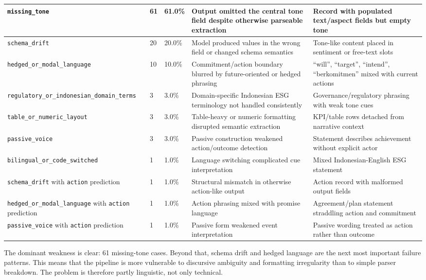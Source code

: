 \begin{landscape}
\begin{table}[p]
\begin{tabularx}{\linewidth}{|X|p{1.8cm}|p{1.8cm}|X|X|}
\texttt{missing\_tone} & 61 & 61.0\% & Output omitted the central tone field despite otherwise parseable extraction & Record with populated text/aspect fields but empty tone \\ \hline
\texttt{schema\_drift} & 20 & 20.0\% & Model produced values in the wrong field or changed schema semantics & Tone-like content placed in sentiment or free-text slots \\ \hline
\texttt{hedged\_or\_modal\_language} & 10 & 10.0\% & Commitment/action boundary blurred by future-oriented or hedged phrasing & “will”, “target”, “intend”, “berkomitmen” mixed with current actions \\ \hline
\texttt{regulatory\_or\_indonesian\_domain\_terms} & 3 & 3.0\% & Domain-specific Indonesian ESG terminology not handled consistently & Governance/regulatory phrasing with weak tone cues \\ \hline
\texttt{table\_or\_numeric\_layout} & 3 & 3.0\% & Table-heavy or numeric formatting disrupted semantic extraction & KPI/table rows detached from narrative context \\ \hline
\texttt{passive\_voice} & 3 & 3.0\% & Passive construction weakened action/outcome detection & Statement describes achievement without explicit actor \\ \hline
\texttt{bilingual\_or\_code\_switched} & 1 & 1.0\% & Language switching complicated cue interpretation & Mixed Indonesian-English ESG statement \\ \hline
\texttt{schema\_drift} with \texttt{action} prediction & 1 & 1.0\% & Structural mismatch in otherwise action-like output & Action record with malformed output fields \\ \hline
\texttt{hedged\_or\_modal\_language} with \texttt{action} prediction & 1 & 1.0\% & Action phrasing mixed with promise language & Agreement/plan statement straddling action and commitment \\ \hline
\texttt{passive\_voice} with \texttt{action} prediction & 1 & 1.0\% & Passive form weakened event interpretation & Passive wording treated as action rather than outcome \\ \hline
\end{tabularx}
\end{table}
\end{landscape}


The dominant weakness is clear: 61 missing-tone cases. Beyond that, schema drift and hedged language are the next most important failure patterns. This means that the pipeline is more vulnerable to discursive ambiguity and formatting irregularity than to simple parser breakdown. The problem is therefore partly linguistic, not only technical.

